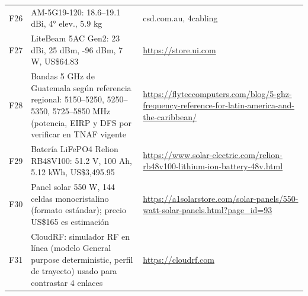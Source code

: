 \begin{longtable}{p{.9cm}p{5.6cm}p{6.2cm}}
F26 & AM-5G19-120: 18.6–19.1 dBi, 4° elev., 5.9 kg & csd.com.au, 4cabling\\
F27 & LiteBeam 5AC Gen2: 23 dBi, 25 dBm, -96 dBm, 7 W, US\$64.83 & \url{https://store.ui.com}\\
F28 & Bandas 5 GHz de Guatemala según referencia regional: 5150–5250, 5250–5350, 5725–5850 MHz (potencia, EIRP y DFS por verificar en TNAF vigente & \url{https://flyteccomputers.com/blog/5-ghz-frequency-reference-for-latin-america-and-the-caribbean/}\\
F29 & Batería LiFePO4 Relion RB48V100: 51.2 V, 100 Ah, 5.12 kWh, US\$3,495.95 & \url{https://www.solar-electric.com/relion-rb48v100-lithium-ion-battery-48v.html}\\
F30 & Panel solar 550 W, 144 celdas monocristalino (formato estándar); precio US\$165 es estimación & \url{https://a1solarstore.com/solar-panels/550-watt-solar-panels.html?page_id=93}\\
F31 & CloudRF: simulador RF en línea (modelo General purpose deterministic, perfil de trayecto) usado para contrastar 4 enlaces & \url{https://cloudrf.com}\\
\bottomrule\end{longtable}
